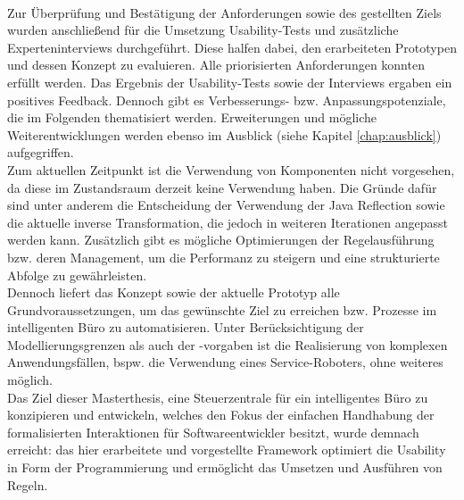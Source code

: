     \\
    \linebreak
    Zur Überprüfung und Bestätigung der Anforderungen sowie des gestellten Ziels wurden anschließend für die Umsetzung Usability-Tests und zusätzliche 
    Experteninterviews durchgeführt. Diese halfen dabei, den erarbeiteten Prototypen und dessen Konzept zu evaluieren. Alle priorisierten 
    Anforderungen konnten erfüllt werden. Das Ergebnis der Usability-Tests sowie der Interviews ergaben ein positives Feedback. Dennoch 
    gibt es Verbesserungs- bzw. Anpassungspotenziale, die im Folgenden thematisiert werden. Erweiterungen und mögliche Weiterentwicklungen werden 
    ebenso im Ausblick (siehe Kapitel \ref{chap:ausblick}) aufgegriffen. 
    \\
    \linebreak 
    Zum aktuellen Zeitpunkt ist die Verwendung von Komponenten nicht vorgesehen, da diese im Zustandsraum derzeit keine Verwendung haben. Die 
    Gründe dafür sind unter anderem die Entscheidung der Verwendung der Java Reflection sowie die aktuelle inverse Transformation, die jedoch in weiteren 
    Iterationen angepasst werden kann. Zusätzlich gibt es mögliche Optimierungen der Regelausführung bzw. deren Management, um die Performanz 
    zu steigern und eine strukturierte Abfolge zu gewährleisten.  
    \\
    Dennoch liefert das Konzept sowie der aktuelle Prototyp alle Grundvoraussetzungen, um das gewünschte Ziel zu 
    erreichen bzw. Prozesse im intelligenten Büro zu automatisieren. Unter Berücksichtigung der Modellierungsgrenzen als 
    auch der -vorgaben ist die Realisierung von komplexen Anwendungsfällen, bspw. die Verwendung eines 
    Service-Roboters, ohne weiteres möglich. 
    \\
    \linebreak
    Das Ziel dieser Masterthesis, eine Steuerzentrale für ein intelligentes Büro zu konzipieren und entwickeln, welches den Fokus der 
    einfachen Handhabung der formalisierten Interaktionen für Softwareentwickler besitzt, wurde demnach erreicht: das hier erarbeitete 
    und vorgestellte Framework optimiert die Usability in Form der Programmierung und ermöglicht das Umsetzen und Ausführen von Regeln. 
